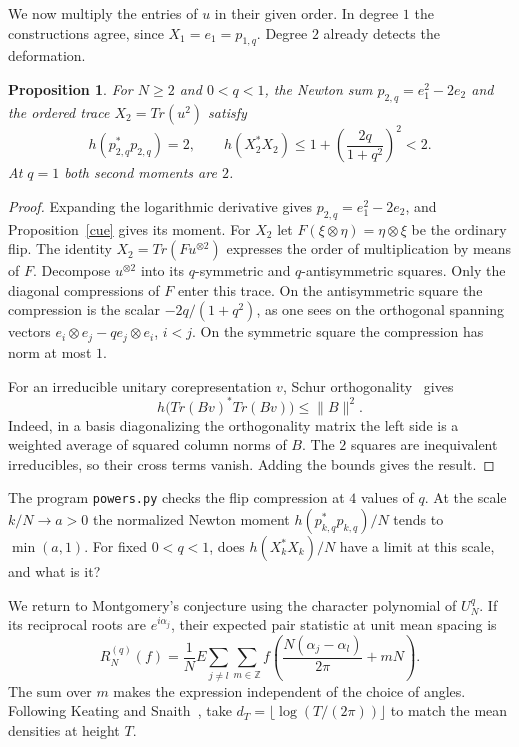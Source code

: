 \documentclass[11pt,a4paper]{article}
\newtheorem{prop}[thm]{Proposition}
\begin{document}
We now multiply the entries of $u$ in their given order. In degree $1$ the constructions agree, since $X_1=e_1=p_{1,q}$. Degree $2$ already detects the deformation.

\begin{samepage}
\begin{prop}
For $N\geq2$ and $0<q<1$, the Newton sum $p_{2,q}=e_1^2-2e_2$ and the ordered trace $X_2=Tr(u^2)$ satisfy
\[
 h(p_{2,q}^*p_{2,q})=2,\qquad
 h(X_2^*X_2)\leq1+\left(\frac{2q}{1+q^2}\right)^2<2.
\]
At $q=1$ both second moments are $2$.
\end{prop}
\end{samepage}
\begin{proof}
Expanding the logarithmic derivative gives $p_{2,q}=e_1^2-2e_2$, and Proposition~\ref{cue} gives its moment. For $X_2$ let $F(\xi\otimes\eta)=\eta\otimes\xi$ be the ordinary flip. The identity $X_2=Tr(Fu^{\otimes2})$ expresses the order of multiplication by means of $F$. Decompose $u^{\otimes2}$ into its $q$-symmetric and $q$-antisymmetric squares. Only the diagonal compressions of $F$ enter this trace. On the antisymmetric square the compression is the scalar $-2q/(1+q^2)$, as one sees on the orthogonal spanning vectors $e_i\otimes e_j-qe_j\otimes e_i$, $i<j$. On the symmetric square the compression has norm at most $1$.

For an irreducible unitary corepresentation $v$, Schur orthogonality~\cite{nt} gives
\[
 h\big(Tr(Bv)^*Tr(Bv)\big)\leq\|B\|^2 .
\]
Indeed, in a basis diagonalizing the orthogonality matrix the left side is a weighted average of squared column norms of $B$. The $2$ squares are inequivalent irreducibles, so their cross terms vanish. Adding the bounds gives the result.
\end{proof}

The program \texttt{powers.py} checks the flip compression at $4$ values of $q$. At the scale $k/N\to a>0$ the normalized Newton moment $h(p_{k,q}^*p_{k,q})/N$ tends to $\min(a,1)$. For fixed $0<q<1$, does $h(X_k^*X_k)/N$ have a limit at this scale, and what is it?

We return to Montgomery's conjecture using the character polynomial of $U_N^q$. If its reciprocal roots are $e^{i\alpha_j}$, their expected pair statistic at unit mean spacing is
\[
 R_N^{(q)}(f)=\frac1N E\sum_{j\ne l}\sum_{m\in\mathbb Z}
 f\left(\frac{N(\alpha_j-\alpha_l)}{2\pi}+mN\right).
\]
The sum over $m$ makes the expression independent of the choice of angles. Following Keating and Snaith~\cite{ks}, take $d_T=\lfloor\log(T/(2\pi))\rfloor$ to match the mean densities at height $T$.
\end{document}
